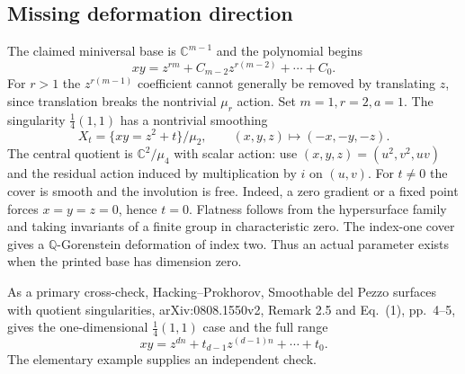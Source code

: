 \documentclass[10pt]{article}
\begin{document}
\subsection*{Missing deformation direction}
The claimed miniversal base is \(\mathbb C^{m-1}\) and the polynomial begins \[xy=z^{rm}+C_{m-2}z^{r(m-2)}+\cdots+C_0.\] For \(r>1\) the \(z^{r(m-1)}\) coefficient cannot generally be removed by translating \(z\), since translation breaks the nontrivial \(\mu_r\) action. Set \(m=1,r=2,a=1\). The singularity \(\frac14(1,1)\) has a nontrivial smoothing \[X_t=\{xy=z^2+t\}/\mu_2,\qquad (x,y,z)\mapsto(-x,-y,-z).\] The central quotient is \(\mathbb C^2/\mu_4\) with scalar action: use \((x,y,z)=(u^2,v^2,uv)\) and the residual action induced by multiplication by \(i\) on \((u,v)\). For \(t\ne0\) the cover is smooth and the involution is free. Indeed, a zero gradient or a fixed point forces \(x=y=z=0\), hence \(t=0\). Flatness follows from the hypersurface family and taking invariants of a finite group in characteristic zero. The index-one cover gives a \(\mathbb Q\)-Gorenstein deformation of index two. Thus an actual parameter exists when the printed base has dimension zero.\par
As a primary cross-check, Hacking–Prokhorov, Smoothable del Pezzo surfaces with quotient singularities, arXiv:0808.1550v2, Remark 2.5 and Eq. (1), pp. 4–5, gives the one-dimensional \(\frac14(1,1)\) case and the full range \[xy=z^{dn}+t_{d-1}z^{(d-1)n}+\cdots+t_0.\] The elementary example supplies an independent check.\par
\end{document}
